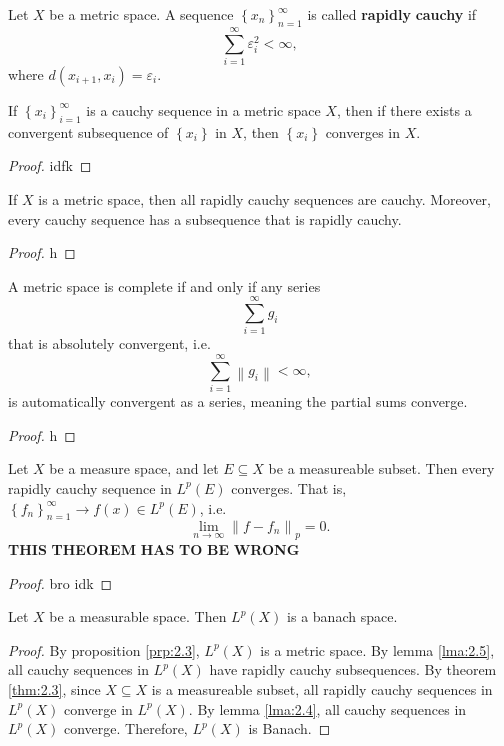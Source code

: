 \documentclass[11pt, letterpaper]{report}
\begin{document}
\begin{definition}\label{dfn:2.9}
	Let $X$ be a metric space. A sequence $\left\{ x_n \right\}_{n=1}^\infty$ is called \textbf{rapidly} \textbf{cauchy} if
\[
	\sum_{i=1}^{\infty} \varepsilon_i^2<\infty
,\]
	where $d(x_{i+1},x_i)=\varepsilon_i$.
\end{definition}
\begin{lemma}\label{lma:2.4}
	If $\left\{ x_i \right\}_{i=1}^\infty$ is a cauchy sequence in a metric space $X$, then if there exists a convergent subsequence of $\left\{ x_i \right\} $ in $X$, then $\left\{ x_i \right\} $ converges in $X$.
\end{lemma}
\begin{proof}
	idfk
\end{proof}
\begin{lemma}\label{lma:2.5}
	If $X$ is a metric space, then all rapidly cauchy sequences are cauchy. Moreover, every cauchy sequence has a subsequence that is rapidly cauchy.
\end{lemma}
\begin{proof}
	h
\end{proof}
\begin{corollary}\label{cor:2.1}
	A metric space is complete if and only if any series
	\[
		\sum_{i=1}^{\infty} g_i
	\]
	that is absolutely convergent, i.e.
	\[
		\sum_{i=1}^\infty \left\lVert g_i \right\rVert <\infty
	,\]
	is automatically convergent as a series, meaning the partial sums converge.
\end{corollary}
\begin{proof}
	h
\end{proof}
\begin{theorem}\label{thm:2.3}
	Let $X$ be a measure space, and let $E\subseteq X$ be a measureable subset. Then every rapidly cauchy sequence in $L^p(E)$ converges. That is, $\left\{ f_n \right\}_{n=1}^\infty\to f(x)\in L^p(E)$, i.e.
	\[
		\lim_{n \to \infty} \left\lVert f-f_n \right\rVert_p=0
	.\]
	\textbf{THIS} \textbf{THEOREM} \textbf{HAS} \textbf{TO} \textbf{BE} \textbf{WRONG}
\end{theorem}
\begin{proof}
	bro idk
\end{proof}
\begin{theorem}\label{thm:2.4}
	Let $X$ be a measurable space. Then $L^p(X)$ is a banach space.
\end{theorem}
\begin{proof}
	By proposition \ref{prp:2.3}, $L^p(X)$ is a metric space. By lemma \ref{lma:2.5}, all cauchy sequences in $L^p(X)$ have rapidly cauchy subsequences. By theorem \ref{thm:2.3}, since $X\subseteq X$ is a measureable subset, all rapidly cauchy sequences in $L^p(X)$ converge in $L^p(X)$. By lemma \ref{lma:2.4}, all cauchy sequences in $L^p(X)$ converge. Therefore, $L^p(X)$ is Banach.
\end{proof}
\end{document}
